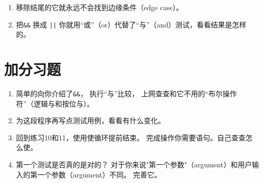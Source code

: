 \begin{enumerate}
\item 移除结尾的它就永远不会找到边缘条件（edge case）。
\item 把\verb|&&| 换成 \verb,||, 你就用“或”（or）代替了“与”（and）测试，看看结果是怎样的。
\end{enumerate}

\section{加分习题}

\begin{enumerate}
\item 简单的向你介绍了\verb|&&|， 执行“与”比较， 上网查查和它不用的“布尔操作符”（逻辑与和按位与）。
\item 为这段程序再写点测试用例，看看有什么变化。
\item 回到练习10和11，使用使循环提前结束。 完成操作你需要语句。自己查查怎么使。
\item 第一个测试是否真的是对的？ 对于你来说"第一个参数"（argument）和用户输入的第一个参数（argument）不同。 完善它。
\end{enumerate}

